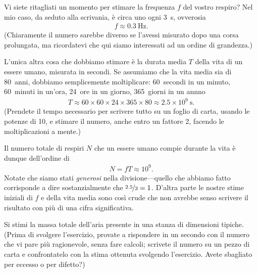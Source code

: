\begin{solution}

Vi siete ritagliati un momento per stimare la frequenza $f$ del vostro respiro?
Nel mio caso, da seduto alla scrivania, \`e circa uno ogni $3$~s, ovverosia
\begin{align*}
  f \approx 0.3~\text{Hz}.
\end{align*}
(Chiaramente il numero sarebbe diverso se l'avessi misurato dopo
una corsa prolungata, ma ricordatevi che qui siamo interessati ad un ordine
di grandezza.)

L'unica altra cosa che dobbiamo stimare \`e la durata media $T$ della vita di un
essere umano, misurata in secondi. Se assumiamo che la vita media sia di 80~anni,
dobbiamo semplicemente moltiplicare: 60~secondi in un minuto, 60~minuti in un'ora,
24~ore in un giorno, 365~giorni in un annno
\begin{align*}
  T \approx 60 \times 60 \times 24 \times 365 \times 80 \approx 2.5 \times 10^9~\text{s}.
\end{align*}
(Prendete il tempo necessario per scrivere tutto su un foglio di carta, usando
le potenze di 10, e stimare il numero, anche entro un fattore 2, facendo le
moltiplicazioni a mente.)

Il numero totale di respiri $N$ che un essere umano compie durante la
vita \`e dunque dell'ordine di
\begin{align}
  N = f T \approx 10^9.
\end{align}
Notate che siamo stati \emph{generosi} nella divisione---quello che abbiamo fatto
corrisponde a dire sostanzialmente che $\nicefrac{2.5}{3} = 1$. D'altra parte le
nostre stime iniziali di $f$ e della vita media sono così crude che non avrebbe
senso scrivere il risultato con più di una cifra significativa.

\end{solution}


\begin{exercise}

Si stimi la massa totale dell'aria presente in una stanza di dimensioni tipiche.
(Prima di svolgere l'esercizio, provate a rispondere in un secondo con il numero
che vi pare pi\`u ragionevole, senza fare calcoli; scrivete il numero su un
pezzo di carta e confrontatelo con la stima ottenuta svolgendo l'esercizio. Avete
sbagliato per eccesso o per difetto?)

\end{exercise}


